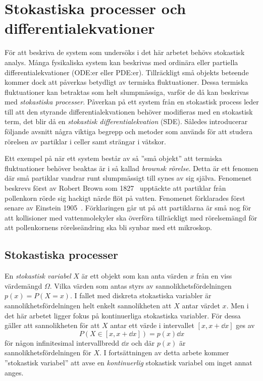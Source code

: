 \chapter{Stokastiska processer och differentialekvationer}

För att beskriva de system som undersöks i det här arbetet
behövs stokastisk analys. Många fysikaliska system kan beskrivas med ordinära eller partiella differential\-ekvationer (ODE:er
eller PDE:er). Tillräckligt små objekts beteende kommer dock att påverkas betydligt av termiska fluktuationer. Dessa termiska fluktuationer kan betraktas som helt
slumpmässiga, varför de då kan beskrivas med \emph{stokastiska processer}. Påverkan på ett system från en stokastisk process leder
till att den styrande differentialekvationen behöver modifieras med en stokastisk term,
det blir då en \emph{stokastisk differentialekvation} (SDE). 
Således introducerar följande avsnitt några viktiga begrepp och metoder 
som används för att studera rörelsen av partiklar i celler samt 
strängar i vätskor. 

Ett exempel på när ett system består av så ''små objekt'' att termiska
fluktuationer behöver beaktas är i så kallad \emph{brownsk rörelse}. 
Detta är ett fenomen där små partiklar vandrar runt slumpmässigt till synes av sig själva. Fenomenet beskrevs först av Robert Brown som 1827~\cite{Brown1828} upptäckte att partiklar från pollenkorn rörde sig hackigt närde flöt på vatten. Fenomenet förklarades först senare av Einstein 1905~\cite{Einstein1905}. Förklaringen går ut på att partiklarna är små nog för att kollisioner med vattenmolekyler ska överföra tillräckligt med rörelsemängd för att pollenkornens rörelseändring ska bli synbar med ett mikroskop. 


\section{Stokastiska processer}
En \emph{stokastisk variabel} $X$ är ett objekt som kan anta värden
$x$ från en viss värdemängd $\Omega$. Vilka värden som antas styrs av
sannolikhetsfördelningen $p(x)=P(X=x)$. I fallet med diskreta stokastiska
variabler är sannolikhetsfördelningen helt enkelt sannolikheten att
$X$ antar värdet $x$. Men i det här arbetet ligger fokus på
kontinuerliga stokastiska variabler. För dessa gäller att sannolikheten för att $X$ antar ett värde i intervallet $[x, x+\dd{x}]$ ges av
\begin{equation}
P(X\in[x, x+\dd{x}]) =p(x)\dd{x}
\end{equation}
för någon infinitesimal intervallbredd $\dd{x}$ och där $p(x)$ är sannolikhetsfördelningen för $X$. 
I fortsättningen av detta arbete kommer ''stokastisk variabel'' att
avse en \emph{kontinuerlig} stokastisk variabel om inget annat anges.


